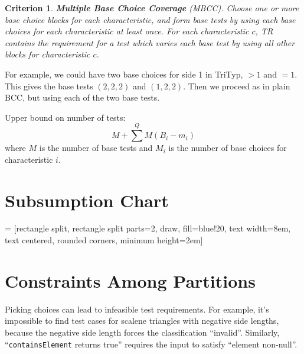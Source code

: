 \documentclass[11pt]{article}
\newtheorem{crit}{Criterion}
\begin{document}
\begin{crit}
{\bf Multiple Base Choice Coverage} (MBCC). Choose one or more base
choice blocks for each characteristic, and form base tests by using
each base choices for each characteristic at least once. For each
characteristic $c$, TR contains the requirement for a test which
varies each base test by using all other blocks for characteristic $c$.
\end{crit}

For example, we could have two base choices for side 1 in TriTyp, 
$> 1$ and $= 1$. This gives the base tests $(2, 2, 2)$ and $(1, 2, 2)$.
Then we proceed as in plain BCC, but using each of the two base tests.

Upper bound on number of tests:
\[ M + \sum^Q M (B_i - m_i) \]
where $M$ is the number of base tests and $M_i$ is the number of base
choices for characteristic $i$.

\section*{Subsumption Chart}

 = [rectangle split, rectangle split parts=2, draw, fill=blue!20, 
    text width=8em, text centered, rounded corners, minimum height=2em]

\begin{center}
\label{SC}
\end{center}

\section*{Constraints Among Partitions}
Picking choices can lead to infeasible test requirements.
For example, it's impossible to find test cases for scalene triangles
with negative side lengths, because the negative side length forces the
classification ``invalid''. Similarly, ``{\tt containsElement} returns true''
requires the input to satisfy ``element non-null''.
\end{document}
